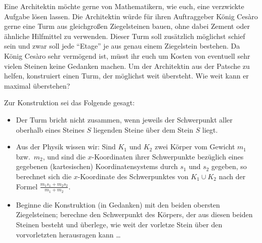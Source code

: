\begin{prob}
  Eine Architektin möchte gerne von Mathematikern, wie euch, eine verzwickte
  Aufgabe lösen lassen. Die Architektin würde für ihren Auftraggeber König
  Cesàro gerne eine Turm aus gleichgroßen Ziegelsteinen bauen, ohne dabei Zement
  oder ähnliche Hilfmittel zu verwenden. Dieser Turm soll zusätzlich möglichst
  schief sein und zwar soll jede \enquote{Etage} je aus genau einem Ziegelstein
  bestehen. Da König Cesàro sehr vermögend ist, müsst ihr euch um Kosten von
  eventuell sehr vielen Steinen keine Gedanken machen. Um der Architektin aus
  der Patsche zu helfen, konstruiert einen Turm, der möglichst weit übersteht.
  Wie weit kann er maximal überstehen?
  \begin{center}
    
  \end{center}
  Zur Konstruktion sei das Folgende gesagt:
  \begin{itemize}
  \item Der Turm bricht nicht zusammen, wenn jeweils der
    Schwerpunkt aller oberhalb eines Steines $S$ liegenden Steine über dem Stein
    $S$ liegt.
  \item Aus der Physik wissen wir: Sind $K_1$ und $K_2$ zwei Körper vom Gewicht
    $m_1$ bzw.~$m_2$, und sind die $x$-Koordinaten ihrer Schwerpunkte bezüglich
    eines gegebenen (kartesischen) Koordinatensystems durch $s_1$ und $s_2$
    gegeben, so berechnet sich die $x$-Koordinate des Schwerpunktes von
    $K_1 \cup K_2$ nach der Formel
    $\displaystyle{\frac{m_1 s_1 + m_2 s_2}{m_1 + m_2}}$.
  \item Beginne die Konstruktion (in Gedanken) mit den beiden obersten
    Ziegelsteinen; berechne den Schwerpunkt des Körpers, der aus diesen beiden
    Steinen besteht und überlege, wie weit der vorletze Stein über den
    vorvorletzten herausragen kann \dots \end{itemize}
\end{prob}
